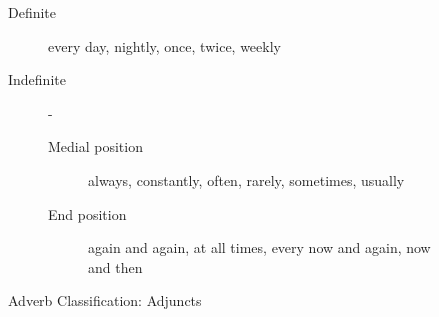 \begin{figure}[htb]
{{\begin{description}
\begin{singlespace}
\begin{description}
            \begin{description}
               \item [Definite] every day, nightly, once, twice, weekly
               \item [Indefinite] - 
                  \begin{description}
                     \item [Medial position] always, constantly, often, 
                                             rarely, sometimes, usually
                     \item [End position] again and again, at all times, 
                                          every now and again, now and then
                  \end{description}
            \end{description}
      \end{description}
    \end{singlespace}
  \end{description}
}}
  \caption{Adverb Classification: Adjuncts}
  \label{fig:adjuncts}
\end{figure}


